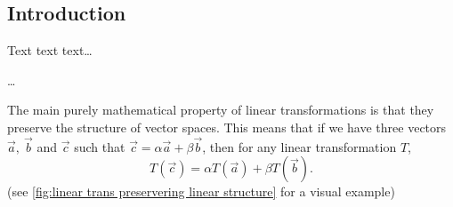 \subsection{Introduction}
Text text text\dots

\dots

The main purely mathematical property of linear transformations is that they preserve the structure of vector spaces. This means that if we have three vectors $\vec{a},\ \vec{b}$ and $\vec{c}$ such that $\vec{c}=\alpha\vec{a}+\beta\vec{b}$, then for any linear transformation $T$,
\begin{equation}
	T(\vec{c}) = \alpha T(\vec{a}) + \beta T(\vec{b}).
	\label{eq:}
\end{equation}
(see \autoref{fig:linear trans preservering linear structure} for a visual example)

